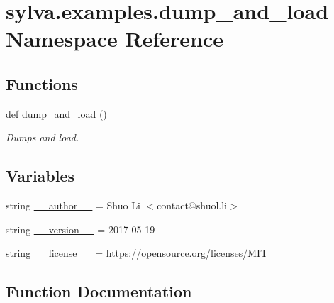 \hypertarget{namespacesylva_1_1examples_1_1dump__and__load}{}\section{sylva.\+examples.\+dump\+\_\+and\+\_\+load Namespace Reference}
\label{namespacesylva_1_1examples_1_1dump__and__load}
\subsection*{Functions}
\begin{DoxyCompactItemize}
\item 
def \hyperlink{namespacesylva_1_1examples_1_1dump__and__load_afb1e7b81c3c5d6dcb649ce2c3e32bdf7}{dump\+\_\+and\+\_\+load} ()
\begin{DoxyCompactList}\small\item\em Dumps and load. \end{DoxyCompactList}\end{DoxyCompactItemize}
\subsection*{Variables}
\begin{DoxyCompactItemize}
\item 
string \hyperlink{namespacesylva_1_1examples_1_1dump__and__load_adcbf27850becc572711605ccd2a292cb}{\+\_\+\+\_\+author\+\_\+\+\_\+} = \textquotesingle{}Shuo Li $<$contact@shuol.\+li$>$\textquotesingle{}
\item 
string \hyperlink{namespacesylva_1_1examples_1_1dump__and__load_a12238f83d54958fa6d0f7b33e45a901e}{\+\_\+\+\_\+version\+\_\+\+\_\+} = \textquotesingle{}2017-\/05-\/19\textquotesingle{}
\item 
string \hyperlink{namespacesylva_1_1examples_1_1dump__and__load_a1ccb255a35f981f14b86bbc21a4f8e45}{\+\_\+\+\_\+license\+\_\+\+\_\+} = \textquotesingle{}https\+://opensource.\+org/licenses/M\+IT\textquotesingle{}
\end{DoxyCompactItemize}


\subsection{Function Documentation}
\mbox{\label{namespacesylva_1_1examples_1_1dump__and__load_afb1e7b81c3c5d6dcb649ce2c3e32bdf7}} 
